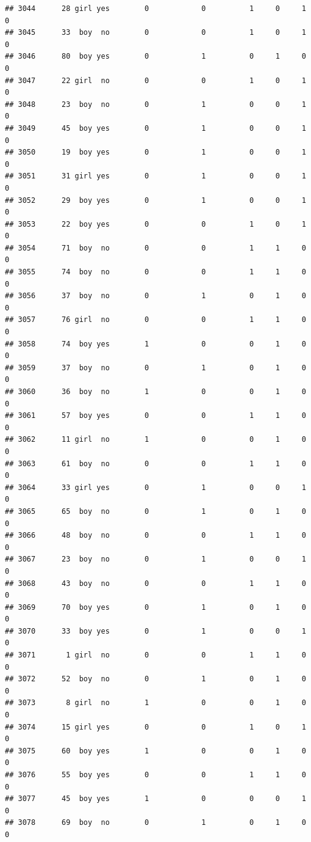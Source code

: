 \documentclass[man]{apa6}
\begin{document}
\begin{verbatim}
## 3044      28 girl yes        0            0          1     0     1     0
## 3045      33  boy  no        0            0          1     0     1     0
## 3046      80  boy yes        0            1          0     1     0     0
## 3047      22 girl  no        0            0          1     0     1     0
## 3048      23  boy  no        0            1          0     0     1     0
## 3049      45  boy yes        0            1          0     0     1     0
## 3050      19  boy yes        0            1          0     0     1     0
## 3051      31 girl yes        0            1          0     0     1     0
## 3052      29  boy yes        0            1          0     0     1     0
## 3053      22  boy yes        0            0          1     0     1     0
## 3054      71  boy  no        0            0          1     1     0     0
## 3055      74  boy  no        0            0          1     1     0     0
## 3056      37  boy  no        0            1          0     1     0     0
## 3057      76 girl  no        0            0          1     1     0     0
## 3058      74  boy yes        1            0          0     1     0     0
## 3059      37  boy  no        0            1          0     1     0     0
## 3060      36  boy  no        1            0          0     1     0     0
## 3061      57  boy yes        0            0          1     1     0     0
## 3062      11 girl  no        1            0          0     1     0     0
## 3063      61  boy  no        0            0          1     1     0     0
## 3064      33 girl yes        0            1          0     0     1     0
## 3065      65  boy  no        0            1          0     1     0     0
## 3066      48  boy  no        0            0          1     1     0     0
## 3067      23  boy  no        0            1          0     0     1     0
## 3068      43  boy  no        0            0          1     1     0     0
## 3069      70  boy yes        0            1          0     1     0     0
## 3070      33  boy yes        0            1          0     0     1     0
## 3071       1 girl  no        0            0          1     1     0     0
## 3072      52  boy  no        0            1          0     1     0     0
## 3073       8 girl  no        1            0          0     1     0     0
## 3074      15 girl yes        0            0          1     0     1     0
## 3075      60  boy yes        1            0          0     1     0     0
## 3076      55  boy yes        0            0          1     1     0     0
## 3077      45  boy yes        1            0          0     0     1     0
## 3078      69  boy  no        0            1          0     1     0     0

\end{verbatim}
\end{document}

